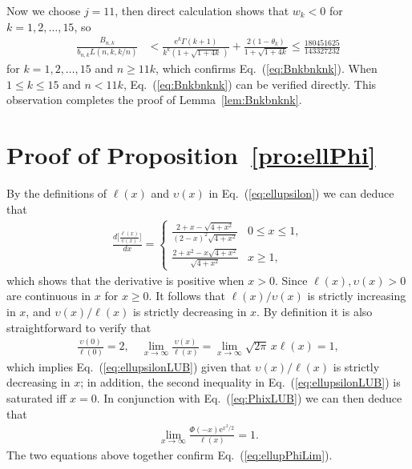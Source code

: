 \documentclass[aop]{imsart}
\theoremstyle{plain}
\theoremstyle{remark}
\newcommand{\rme}{\mathrm{e}}
\newcommand{\1}{\operatorname{\uppercase\expandafter{\romannumeral1}}}
\newcommand{\2}{\operatorname{\uppercase\expandafter{\romannumeral2}}}
\newcommand{\3}{\operatorname{\uppercase\expandafter{\romannumeral3}}}
\newcommand{\4}{\operatorname{\uppercase\expandafter{\romannumeral4}}}
\newcommand{\5}{\operatorname{\uppercase\expandafter{\romannumeral5}}}
\newcommand{\6}{\operatorname{\uppercase\expandafter{\romannumeral6}}}
\newcommand{\7}{\operatorname{\uppercase\expandafter{\romannumeral7}}}
\newcommand{\8}{\operatorname{\uppercase\expandafter{\romannumeral8}}}
\newcommand{\9}{\operatorname{\uppercase\expandafter{\romannumeral9}}}
\newcommand{\eref}[1]{Eq.~\textup{(\ref{#1})}}
\newcommand{\lref}[1]{Lemma~\ref{#1}}
\newcommand{\pref}[1]{Proposition~\ref{#1}}
\begin{document}
\begin{appendix}
	
	Now we choose $j=11$, then direct calculation shows that $w_k<0$ for $k=1,2,\ldots, 15$, so 
	\begin{align}
	\frac{B_{n,k}}{b_{n,k}L(n,k,k/n)}&< \frac{\rme^k \Gamma(k+1)}{k^k (1+\sqrt{1+4k}\,)}+\frac{2(1-\theta_k)}{1+\sqrt{1+4k}}\leq \frac{180451625}{143327232} 
	\end{align}
	for $k=1,2,\ldots, 15$ and $ n\geq 11 k$, which confirms \eref{eq:Bnkbnknk}. 
	When $1\leq k\leq 15$ and  $n<11k$, \eref{eq:Bnkbnknk} can be verified directly. This observation completes the proof of \lref{lem:Bnkbnknk}. 



\section{\label{app:ellPhiProof}Proof of \pref{pro:ellPhi}}

By the definitions of $\ell(x)$ and $\upsilon(x)$ in \eref{eq:ellupsilon} we can deduce that
\begin{align}
\frac{d\bigl[\frac{\ell(x)}{\upsilon(x)}\bigr]}{dx}=\begin{cases}
\frac{2+x-\sqrt{4 + x^2}}{(2-x)^2\sqrt{4 + x^2}} &0\leq x\leq 1,\\[1ex]
\frac{2+x^2-x\sqrt{4 + x^2}}{\sqrt{4 + x^2}} &x\geq 1,
\end{cases}
\end{align}
which shows that the derivative is positive when $x>0$. Since  $\ell(x),\upsilon(x)>0$
 are continuous in $x$ for $x\geq 0$. It follows that  $\ell(x)/\upsilon(x)$ is  strictly increasing in $x$, and
$\upsilon(x)/\ell(x)$  is  strictly decreasing in $x$. By definition it is also straightforward to verify that 
\begin{align}
\frac{\upsilon(0)}{\ell(0)}=2,\quad \lim_{x\to \infty}\frac{\upsilon(x)}{\ell(x)}=\lim_{x\to \infty}\sqrt{2\pi} \,x\ell(x)=1,\label{eq:ellupsilonLimProof}
\end{align}
which implies \eref{eq:ellupsilonLUB} given that $\upsilon(x)/\ell(x)$  is  strictly decreasing in $x$; in addition,  the second inequality in  \eref{eq:ellupsilonLUB} is saturated iff $x=0$. In conjunction with \eref{eq:PhixLUB} we can then deduce that 
\begin{align}
\lim_{x\to \infty}\frac{\Phi(-x)\rme^{x^2/2}}{\ell(x)}=1.
\end{align}
The two equations above 
together  confirm \eref{eq:ellupPhiLim}. 


\end{appendix}
\end{document}
